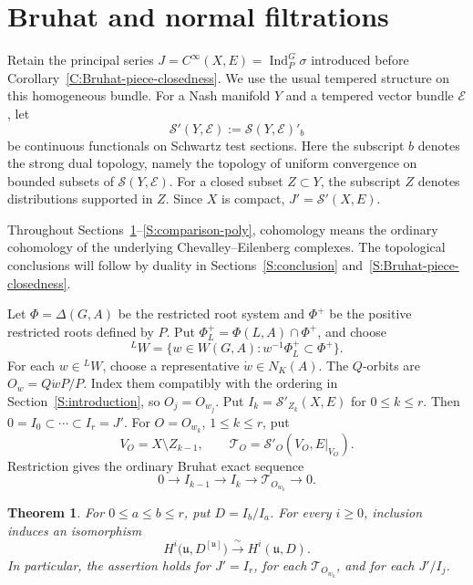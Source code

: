 \documentclass[a4paper,12pt]{amsart}
\numberwithin{equation}{section}
\theoremstyle{plain}
\newtheorem{theorem}{Theorem}[section]
\theoremstyle{definition}
\theoremstyle{remark}
\begin{document}
\section{Bruhat and normal filtrations}\label{S:filtrations}

Retain the principal series $J=C^\infty(X,E)=\operatorname{Ind}_P^G\sigma$ introduced before Corollary~\ref{C:Bruhat-piece-closedness}.
We use the usual tempered structure on this homogeneous bundle.
For a Nash manifold $Y$ and a tempered vector bundle $\mathcal E$, let
\[
 \mathcal S'(Y,\mathcal E):=\mathcal S(Y,\mathcal E)'_b
\]
be continuous functionals on Schwartz test sections.
Here the subscript $b$ denotes the strong dual topology, namely the topology of uniform convergence on bounded subsets of $\mathcal S(Y,\mathcal E)$.
For a closed subset $Z\subset Y$, the subscript $Z$ denotes distributions supported in $Z$.
Since $X$ is compact, $J'=\mathcal S'(X,E)$.

Throughout Sections~\ref{S:filtrations}--\ref{S:comparison-poly}, cohomology means the ordinary cohomology of the underlying Chevalley--Eilenberg complexes.
The topological conclusions will follow by duality in Sections~\ref{S:conclusion} and~\ref{S:Bruhat-piece-closedness}.

Let $\Phi=\Delta(G,A)$ be the restricted root system and $\Phi^+$ be the positive restricted roots defined by $P$.
Put $\Phi_L^+=\Phi(L,A)\cap\Phi^+$, and choose
\[
 {}^LW=\{w\in W(G,A):w^{-1}\Phi_L^+\subset\Phi^+\}.
\]
For each $w\in{}^LW$, choose a representative $\dot w\in N_K(A)$.
The $Q$-orbits are $O_w=Q\dot wP/P$.
Index them compatibly with the ordering in Section~\ref{S:introduction}, so $O_j=O_{w_j}$.
Put $I_k=\mathcal S'_{Z_k}(X,E)$ for $0\leq k\leq r$.
Then $0=I_0\subset\cdots\subset I_r=J'$.
For $O=O_{w_k}$, $1\leq k\leq r$, put
\[
 V_O=X\setminus Z_{k-1},\qquad
 \mathcal T_O=\mathcal S'_O(V_O,E|_{V_O}).
\]
Restriction gives the ordinary Bruhat exact sequence
\begin{equation}\label{Eq:Bruhat-ordinary}
 0\longrightarrow I_{k-1}\longrightarrow I_k
 \longrightarrow\mathcal T_{O_{w_k}}\longrightarrow0.
\end{equation}

\begin{theorem}\label{T:relative-cohomological-comparison}
For $0\leq a\leq b\leq r$, put $D=I_b/I_a$.
For every $i\geq0$, inclusion induces an isomorphism
\[
 H^i\bigl(\mathfrak u,D^{[\mathfrak u]}\bigr)
 \xrightarrow{\ \sim\ }H^i(\mathfrak u,D).
\]
In particular, the assertion holds for $J'=I_r$, for each $\mathcal T_{O_{w_k}}$, and for each $J'/I_j$.
\end{theorem}
\end{document}
